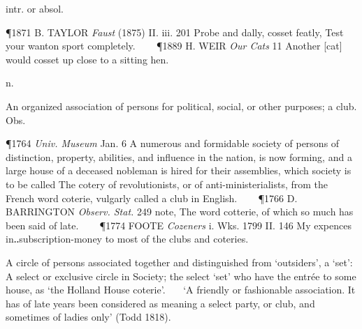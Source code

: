 \begin{description}[wide, labelwidth=!, labelindent=0pt]
\begin{myenumerate}
 intr. or absol.

\P 1871 B. TAYLOR  \textit{Faust} (1875) II. iii. 201 Probe and dally, cosset featly, Test your wanton sport completely.    
\P 1889 H. WEIR  \textit{Our Cats} 11 Another [cat] would cosset up close to a sitting hen.
\end{myenumerate}


 n.

\noindent {}

\noindent [a. F. coterie ‘a company of people who live in familiarity, or who cabal in a common interest’ (Littré), orig. ‘a certain number of peasants united together to hold land from a lord’; ‘companie, societie, association of countrey people’ (Cotgr.), f. cotier = med.L. cotārius, coterius cottar, tenant of a cota or cot. Cf. F. cotterie ‘a base, ignoble, and seruile tenure, or tenement, not held in fee, and yeelding only rent, or if more, but cens or surcens at most’ (Cotgr.).

   By Walker and Smart stressed on the last syllable as French: the latter has the o short; whence the 18th c. cotterie, and its riming in Byron with lottery.]

\begin{myenumerate}

 An organized association of persons for political, social, or other purposes; a club. Obs.

\P 1764  \textit{Univ. Museum} Jan. 6 A numerous and formidable society of persons of distinction, property, abilities, and influence in the nation, is now forming, and a large house of a deceased nobleman is hired for their assemblies, which society is to be called The cotery of revolutionists, or of anti-ministerialists, from the French word coterie, vulgarly called a club in English.    
\P 1766 D. BARRINGTON  \textit{Observ. Stat.} 249 note, The word cotterie, of which so much has been said of late.    
\P 1774 FOOTE  \textit{Cozeners} i. Wks. 1799 II. 146  My expences in‥subscription-money to most of the clubs and coteries.

 A circle of persons associated together and distinguished from ‘outsiders’, a ‘set’:  A select or exclusive circle in Society; the select ‘set’ who have the entrée to some house, as ‘the Holland House coterie’.
   ‘A friendly or fashionable association. It has of late years been considered as meaning a select party, or club, and sometimes of ladies only’ (Todd 1818).


\end{myenumerate}
\end{description}
